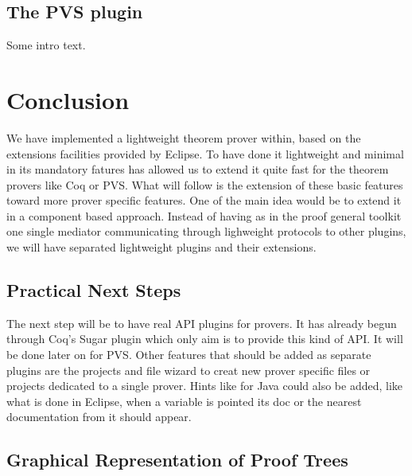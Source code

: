 \documentclass{entcs}
\begin{document}
\subsection{The PVS plugin}
\label{subsec:pvs-plugin}

Some intro text. %

\section{Conclusion}
\label{sec:conclusion}

We have implemented a lightweight theorem prover within, 
based on the extensions facilities provided by Eclipse. 
To have done it lightweight and minimal in its mandatory
fatures has allowed us to extend it quite fast for the theorem 
provers like Coq or PVS.
What will follow is the extension of these basic features toward more prover 
specific features.
One of the main idea would be to extend it in a component based approach.
Instead of having as in the proof general toolkit one single 
mediator communicating through lighweight protocols to other plugins, 
we will have separated lightweight plugins and their extensions.

\subsection{Practical Next Steps}
\label{subsec:practical-next-steps}

The next step will be to have real API plugins for provers. 
It has already begun through Coq's Sugar plugin which only aim 
is to provide this kind of API.
It will be done later on for PVS. Other features that should be added
as separate plugins are the projects and file wizard to creat 
new prover specific files or projects dedicated to a single prover.
Hints like for Java could also be added, like what is done in Eclipse, 
when a variable is pointed its doc or the nearest documentation 
from it should appear. 


\subsection{Graphical Representation of Proof Trees}
\label{subsec:graph-repr-proof}
\end{document}
